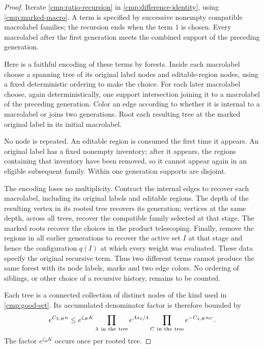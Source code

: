 \begin{proof}
Iterate \eqref{cmp:ratio-recursion} in
\eqref{cmp:difference-identity}, using \eqref{cmp:marked-macro}.  A term
is specified by successive nonempty compatible macrolabel families;
the recursion ends when the term \(1\) is chosen.  Every macrolabel
after the first generation meets the combined support of the preceding
generation.

Here is a faithful encoding of these terms by forests.  Inside each
macrolabel choose a spanning tree of its original label nodes and
editable-region nodes, using a fixed deterministic ordering to make the
choice.  For each later macrolabel choose, again deterministically, one
support intersection joining it to a macrolabel of the preceding
generation.  Color an edge according to whether it is internal to a
macrolabel or joins two generations.  Root each resulting tree at the
marked original label in its initial macrolabel.

No node is repeated.  An editable region is consumed the first time it
appears.  An original label has a fixed nonempty inventory; after it
appears, the regions containing that inventory have been removed, so
it cannot appear again in an eligible subsequent family.  Within one
generation supports are disjoint.

The encoding loses no multiplicity. Contract the internal edges to
recover each macrolabel, including its original labels and editable
regions. The depth of the resulting vertex in its rooted tree
recovers its generation; vertices at the same depth, across all trees,
recover the compatible family selected at that stage. The marked roots
recover the choices in the product telescoping. Finally, remove the
regions in all earlier generations to recover the active set \(I\) at
that stage and hence the configuration \(q(I)\) at which every weight
was evaluated. These data specify the original recursive term.
Thus two different terms cannot produce the same forest with its node
labels, marks and two edge colors. No ordering of siblings, or other
choice of a recursive history, remains to be counted.

Each tree is a connected collection of distinct nodes of the kind used
in \eqref{cmp:good-set}.  Its accumulated denominator factor is therefore
bounded by
\begin{equation}
 e^{C_{3,H}n}
 \le e^{\zeta_HK}
       \prod_{\lambda\ {\rm in\ the\ tree}}e^{As_\lambda/4}
       \prod_{C\ {\rm in\ the\ tree}}e^{-C_{4,H}n_C}.
 \label{cmp:tree-charge}
\end{equation}
The factor \(e^{\zeta_HK}\) occurs once per rooted tree.


\end{proof}
